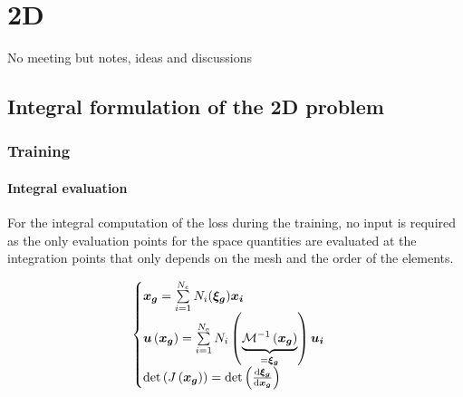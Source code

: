  \chapter[The 19$^{\text{th}}$ of April 2024 -2D]{2D}

\begin{chapabstract}
	No meeting but notes, ideas and discussions
\end{chapabstract}


\minitoc

\section{Integral formulation of the 2D problem}

\subsection{Training}
\subsubsection{Integral evaluation}
For the integral computation of the loss during the training, no input is required as the only evaluation points for the space quantities are evaluated at the integration points that only depends on the mesh and the order of the elements. 


\begin{equation}
	\begin{cases}
		\boldsymbol{x_g} = \sum\limits_{i = 1}^{N_e} N_i(\boldsymbol{\xi_g})\boldsymbol{x_i} \\
		\boldsymbol{u}\left(\boldsymbol{x_g}\right) =  \sum\limits_{i = 1}^{N_e} N_i\left(\underbrace{\mathcal{M}^{-1}\left(\boldsymbol{x_g}\right)}_{=\boldsymbol{\xi_g}}\right)\boldsymbol{u_i } \\[7pt]
		\text{det}\left(J\left(\boldsymbol{x_g}\right)\right) = \text{det}\left(\frac{\mathrm{d}\boldsymbol{\xi_g}}{\mathrm{d}\boldsymbol{x_g}}\right)
	\end{cases}
\end{equation}

